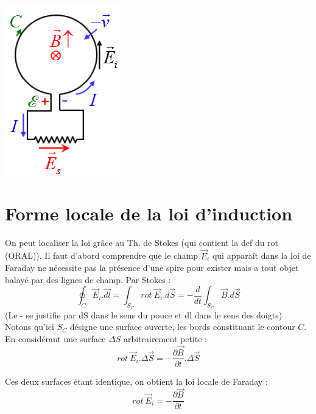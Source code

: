 \documentclass	[11pt, a4paper, openany]{book}
\begin{document}
\begin{center}
\includegraphics[scale=0.45]{em/image15.png}\\
\end{center}

\section{Forme locale de la loi d'induction}
On peut localiser la loi grâce au Th. de Stokes (qui contient la def du rot (ORAL)). Il faut d'abord comprendre que le champ $\vec{E}_i$ qui apparaît dans la loi de Faraday ne nécessite pas la présence d'une spire pour exister mais a tout objet balayé par des lignes de champ. Par Stokes :
\begin{equation}
\oint_C \vec{E}_i.\vec{dl} = \int_{S_C} rot\ \vec{E}_i.d\vec{S} = -\frac{d}{dt}\int_{S_C} \vec{B}.d\vec{S}
\end{equation}
(Le - se justifie par dS dans le sens du pouce et dl dans le sens des doigts)
\\
Notons qu'ici $S_C$ désigne une surface ouverte, les bords constituant le contour $C$.
En considérant une surface $\Delta S$ arbitrairement petite : 
\begin{equation}
rot\ \vec{E}_i.\Delta\vec{S} = -\frac{\partial \vec{B}}{\partial t}.\Delta\vec{S}
\end{equation}

Ces deux surfaces étant identique, on obtient la loi locale de Faraday :
\begin{equation}
rot\ \vec{E}_i = -\frac{\partial \vec{B}}{\partial t}
\end{equation}
\end{document}
